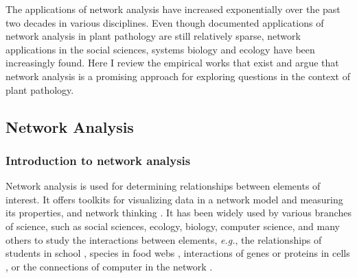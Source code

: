 
The applications of network analysis have increased exponentially over the past two decades in various disciplines. Even though documented applications of network analysis in plant pathology are still relatively sparse, network applications in the social sciences, systems biology and ecology have been increasingly found. Here I review the empirical works that exist and argue that network analysis is a promising approach for exploring questions in the context of plant pathology.



\subsection*{Network Analysis}

\subsubsection*{Introduction to network analysis}

Network analysis is used for determining relationships between elements of interest. It offers toolkits for visualizing data in a network model and measuring its properties, and network thinking \citep{PROULX:2005hx}. It has been widely used by various branches of science, such as social sciences, ecology, biology, computer science, and many others to study the interactions between elements, \textit{e.g.}, the relationships of students in school \citep{moody2001race}, species in food webs \citep{krause2003compartments}, interactions of genes or proteins in cells \citep{guimera2005functional}, or the connections of computer in the network \citep{pastor2001epidemic,newman2006modularity}.


